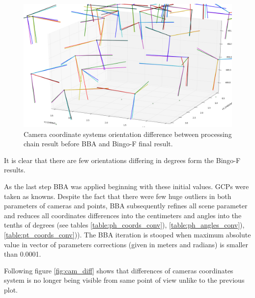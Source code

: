 \documentclass[a4paper,12pt]{article}
\begin{document}

\begin{center}
 \begin{figure}[!h]
    \includegraphics[scale=0.28]{figures/angles_comaprison_relative_orinetaion.png}
     \caption{Camera coordinate systems orientation difference between processing chain result before BBA and Bingo-F final result.}
    \label{fig:cam_diff_bef_bba}
\end{figure}
\end{center}

It is clear that there are few orientations differing in  degrees form the Bingo-F results. 

As the last step BBA was applied beginning with these initial values.
GCPs were taken as knowns.
Despite the fact that there were few huge outliers in both parameters of cameras and points,
BBA subsequently refines all scene parameter and reduces all coordinates 
differences into the centimeters and angles into the tenths of degrees (see tables \ref{table:ph_coords_conv}),
\ref{table:ph_angles_conv}), \ref{table:pt_coords_conv})). 
The BBA iteration is stooped when maximum absolute value in vector of parameters corrections (given in meters and radians) is
smaller than 0.0001.


Following figure \ref{fig:cam_diff} shows that differences of cameras coordinates system is no longer being visible from same point of view
unlike to the previous plot.
\end{document}
